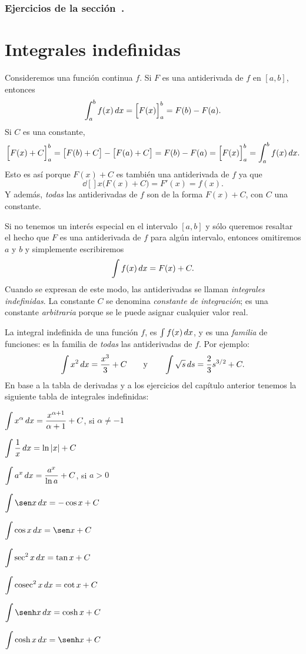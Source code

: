 \subsubsection*{Ejercicios de la sección~.}

\begin{enumerate}
  
\end{enumerate}  


\section{Integrales indefinidas}

Consideremos una función continua $f$. Si $F$ es una antiderivada de $f$ en $[a,b]$, entonces
\[
\int_a^b f(x)\,dx = \Big[F(x)\Big]_a^b = F(b)-F(a).
\]
Si $C$ es una constante, 
\[
  \Big[F(x)+C\Big]_a^b 
  = \big[F(b)+C\big]-\big[F(a)+C\big]= F(b)-F(a)
  = \Big[F(x)\Big]_a^b = \int_a^b f(x)\,dx.
\]
Esto es así porque $F(x)+C$ es también una antiderivada de $f$ ya que
\[
\dd[]{}{x} \big(F(x)+C\big) = F'(x) = f(x).
\]
Y además, \emph{todas} las antiderivadas de $f$ son de la forma $F(x)+C$, con $C$ una constante.

Si no tenemos un interés especial en el intervalo $[a,b]$ y sólo queremos resaltar el hecho que $F$ es una antiderivada de $f$ para algún intervalo, entonces omitiremos $a$ y $b$ y simplemente escribiremos
\[
\int f(x)\,dx = F(x)+C.
\]
Cuando se expresan de este modo, las antiderivadas se llaman \emph{integrales indefinidas}.
La constante $C$ se denomina \emph{constante de integración}; es una constante \emph{arbitraria} porque se le puede asignar cualquier valor real.

La integral indefinida de una función $f$, es $\int f(x)\,dx$, y es una \emph{familia} de funciones: es la familia de \emph{todas} las antiderivadas de $f$. Por ejemplo:
\[
\int x^2\,dx = \frac{x^3}{3} + C 
\qquad\text y \qquad
\int \sqrt{s}\,ds = \frac23 s^{3/2}+C.
\]
En base a la tabla de derivadas y a los ejercicios del capítulo anterior tenemos la siguiente tabla de integrales indefinidas:

\begin{multicols}{2}
  $\displaystyle \int x^\alpha \,dx = \frac{x^{\alpha+1}}{\alpha+1} + C$, si $\alpha\neq -1$
  
  $\displaystyle \int \frac1x\,dx = \ln|x| + C$
  
  $\displaystyle \int a^x \,dx = \frac{a^x}{\ln a}  + C$, si $a>0$
  
  $\D \int \sen x\dx = -\cos x + C$
  
  $\D \int \cos x \dx = \sen x + C$
  
  $\displaystyle \int \sec^2 x\,dx = \tan x + C$
  
  $\displaystyle \int \operatorname{cosec}^2 x\,dx = \cot x + C$
  
  $\D \int \senh x \dx = \cosh x + C$
  
  $\D \int \cosh x \dx = \senh x + C$
  
\end{multicols}

